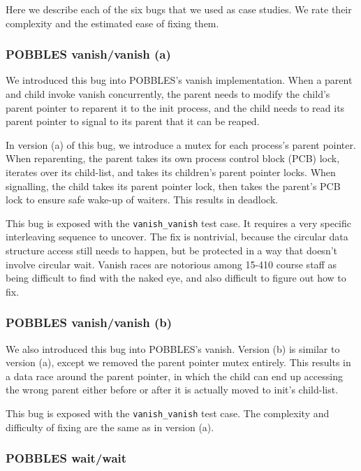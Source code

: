 Here we describe each of the six bugs that we used as case studies. We rate their complexity and the estimated ease of fixing them.

\subsubsection{POBBLES vanish/vanish (a)}

We introduced this bug into POBBLES's vanish implementation. When a parent and child invoke vanish concurrently, the parent needs to modify the child's parent pointer to reparent it to the init process, and the child needs to read its parent pointer to signal to its parent that it can be reaped.

In version (a) of this bug, we introduce a mutex for each process's parent pointer. When reparenting, the parent takes its own process control block (PCB) lock, iterates over its child-list, and takes its children's parent pointer locks. When signalling, the child takes its parent pointer lock, then takes the parent's PCB lock to ensure safe wake-up of waiters. This results in deadlock.

This bug is exposed with the \texttt{vanish\_vanish} test case. It requires a very specific interleaving sequence to uncover.
The fix is nontrivial, because the circular data structure access still needs to happen, but be protected in a way that doesn't involve circular wait.
Vanish races are notorious among 15-410 course staff as being difficult to find with the naked eye, and also difficult to figure out how to fix.

\subsubsection{POBBLES vanish/vanish (b)}

We also introduced this bug into POBBLES's vanish. Version (b) is similar to version (a), except we removed the parent pointer mutex entirely. This results in a data race around the parent pointer, in which the child can end up accessing the wrong parent either before or after it is actually moved to init's child-list.

This bug is exposed with the \texttt{vanish\_vanish} test case. The complexity and difficulty of fixing are the same as in version (a).

\subsubsection{POBBLES wait/wait}

